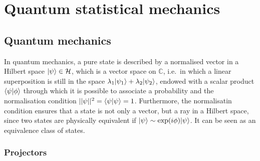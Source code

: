 \part{Quantum statistical mechanics}

\chapter{Quantum mechanics}

    In quantum mechanics, a pure state is described by a normalised vector in a Hilbert space $\vert\psi\rangle \in \mathcal H$, which is a vector space on $\mathbb C$, i.e.~in which a linear superposition is still in the space $\lambda_1 \vert\psi_1\rangle + \lambda_2 \vert\psi_2\rangle$, endowed with a scalar product $\langle\psi\vert\phi\rangle$ through which it is possible to associate a probability and the normalisation condition $||\psi||^2 = \langle\psi\vert\psi\rangle = 1$. Furthermore, the normalisatin condition ensures that a state is not only a vector, but a ray in a Hilbert space, since two states are physically equivalent if $\vert\psi\rangle \sim \exp(i \phi) \vert\psi\rangle$. It can be seen as an equivalence class of states.

\section{Projectors}

